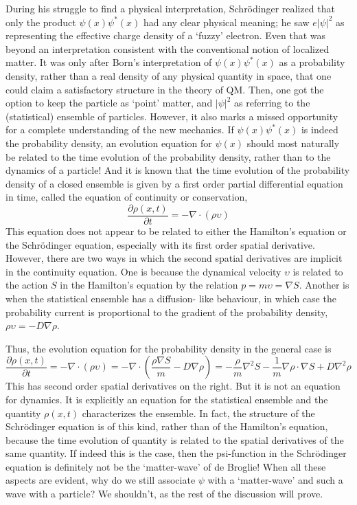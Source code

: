 During his struggle to find a physical interpretation, Schr\"{o}dinger realized that only the
product $\psi(x) \psi^{\ast}(x)$ had any clear physical meaning; he saw $e|\psi|^2$ as representing the effective
charge density of a `fuzzy' electron. Even that was beyond an interpretation consistent
with the conventional notion of localized matter. It was only after Born's interpretation of
$\psi(x)\psi^{\ast} (x)$ as a probability density, rather than a real density of any physical quantity in
space, that one could claim a satisfactory structure in the theory of QM. Then, one got the
option to keep the particle as `point' matter, and $|\psi|^2$ as referring to the (statistical) ensemble
of particles. However, it also marks a missed opportunity for a complete understanding of
the new mechanics. If $\psi(x) \psi^{\ast} (x)$ is indeed the probability density, an evolution equation
for $\psi(x)$ should most naturally be related to the time evolution of the probability density,
rather than to the dynamics of a particle! And it is known that the time evolution of the
probability density of a closed ensemble is given by a first order partial differential equation
in time, called the equation of continuity or conservation,
\begin{equation*}
\frac{\partial \rho (x,t)}{\partial t} = - \nabla \cdot (\rho \upsilon) \tag{8}\label{c14-eq8}
\end{equation*}
This equation does not appear to be related to either the Hamilton's equation or the
Schr\"{o}dinger equation, especially with its first order spatial derivative. However, there are
two ways in which the second spatial derivatives are implicit in the continuity equation. One
is because the dynamical velocity $\upsilon$ is related to the action $S$ in the Hamilton's equation
by the relation $p = m \upsilon =\nabla S$. Another is when the statistical ensemble has a diffusion-
like behaviour, in which case the probability current is proportional to the gradient of the
probability density, $\rho \upsilon = - D \nabla \rho$.

Thus, the evolution equation for the probability density in the general case is
{\fontsize{9}{9}\selectfont\begin{equation*}
\frac{\partial \rho (x,t)}{\partial t} = - \nabla \cdot (\rho \upsilon) = - \nabla \cdot \left(\frac{\rho \nabla S}{m} - D \nabla \rho \right) = - \frac{\rho}{m} \nabla^2 S - \frac{1}{m} \nabla \rho \cdot \nabla S + D \nabla^2 \rho \tag{9}\label{c14-eq9} 
\end{equation*}}
This has second order spatial derivatives on the right. But it is not an equation for dynamics. It
is explicitly an equation for the statistical ensemble and the quantity $\rho (x, t)$ characterizes
the ensemble. In fact, the structure of the Schr\"{o}dinger equation is of this kind, rather than
of the Hamilton's equation, because the time evolution of quantity is related to the spatial
derivatives of the same quantity. If indeed this is the case, then the psi-function in the
Schr\"{o}dinger equation is definitely not be the `matter-wave' of de Broglie! When all these
aspects are evident, why do we still associate $\psi$ with a `matter-wave' and such a wave with a
particle? We shouldn't, as the rest of the discussion will prove.

